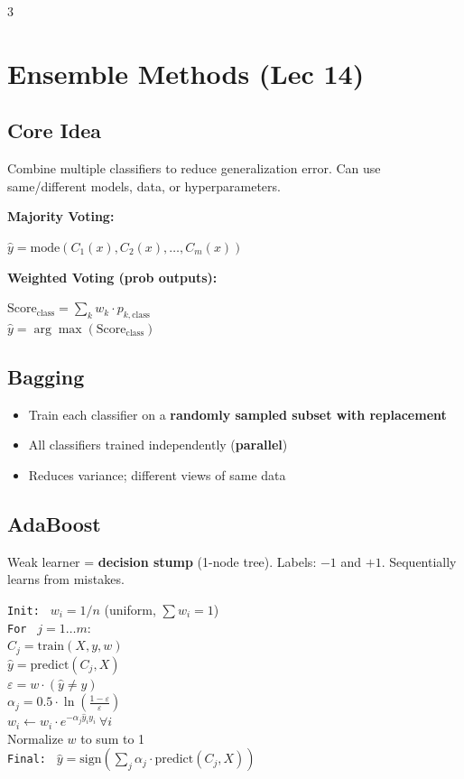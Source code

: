\documentclass[8pt,letterpaper]{extarticle}
\begin{document}
\begin{multicols}{3}

\section{Ensemble Methods (Lec 14)}

\subsection{Core Idea}
Combine multiple classifiers to reduce generalization error. Can use same/different models, data, or hyperparameters.

\textbf{Majority Voting:}
\begin{formulabox}
$\hat{y} = \text{mode}(C_1(x), C_2(x), \ldots, C_m(x))$
\end{formulabox}

\textbf{Weighted Voting (prob outputs):}
\begin{formulabox}
$\text{Score}_\text{class} = \sum_k w_k \cdot p_{k,\text{class}}$\\
$\hat{y} = \arg\max(\text{Score}_\text{class})$
\end{formulabox}

\subsection{Bagging}
\begin{itemize}
  \item Train each classifier on a \textbf{randomly sampled subset with replacement}
  \item All classifiers trained independently (\textbf{parallel})
  \item Reduces variance; different views of same data
\end{itemize}

\subsection{AdaBoost}
Weak learner = \textbf{decision stump} (1-node tree). Labels: $-1$ and $+1$. Sequentially learns from mistakes.

\begin{formulabox}
\texttt{Init: } $w_i = 1/n$ \quad (uniform, $\sum w_i = 1$)\\
\texttt{For } $j = 1\ldots m$:\\
\quad $C_j = \text{train}(X, y, w)$\\
\quad $\hat{y} = \text{predict}(C_j, X)$\\
\quad $\varepsilon = w \cdot (\hat{y} \neq y)$ \\
\quad $\alpha_j = 0.5 \cdot \ln\!\left(\frac{1-\varepsilon}{\varepsilon}\right)$\\
\quad $w_i \leftarrow w_i \cdot e^{-\alpha_j \hat{y}_i y_i}\ \forall i$\\
\quad Normalize $w$ to sum to 1\\
\texttt{Final: } $\hat{y} = \text{sign}\!\left(\sum_j \alpha_j \cdot \text{predict}(C_j, X)\right)$
\end{formulabox}


\end{multicols}
\end{document}
